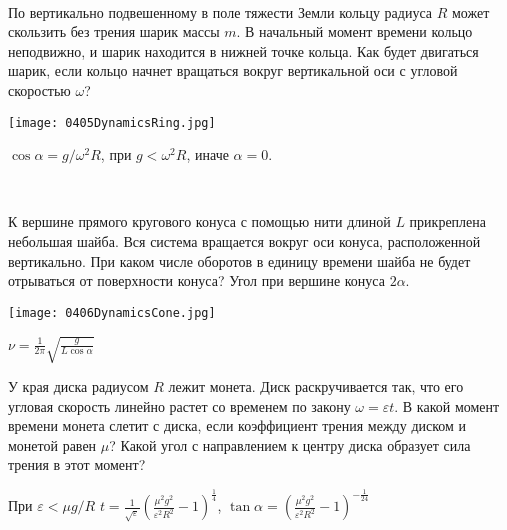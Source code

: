 \begin{ex}
\hspace{0pt} \\
\begin{minipage}{.65\textwidth}
По вертикально подвешенному в поле тяжести Земли кольцу радиуса $R$ может скользить без трения шарик массы $m$. 
В начальный момент времени кольцо неподвижно, и шарик находится в нижней точке кольца. 
Как будет двигаться шарик, если кольцо начнет вращаться вокруг вертикальной оси с угловой скоростью $\omega$?
\end{minipage}
\begin{minipage}{.35\textwidth}
\centering
\texttt{[image: 0405DynamicsRing.jpg]}
\end{minipage}
\begin{ans}
$\cos \alpha = g/\omega^2 R$, при $g < \omega^2 R$, иначе $\alpha = 0$.
\end{ans}
\end{ex}

\begin{ex}
\hspace{0pt} \\
\begin{minipage}{.65\textwidth}
К вершине прямого кругового конуса с помощью нити длиной $L$ прикреплена небольшая шайба. Вся система вращается вокруг оси конуса, расположенной вертикально. При каком числе оборотов в единицу времени шайба не будет отрываться от поверхности конуса? Угол при вершине конуса $2\alpha$.
\end{minipage}
\begin{minipage}{.35\textwidth}
\centering
\texttt{[image: 0406DynamicsCone.jpg]}
\end{minipage}
\begin{ans}
$\nu = \frac{1}{2\pi}\sqrt{\frac{g}{L \cos \alpha}}$
\end{ans}
\end{ex}

\begin{ex}
У края диска радиусом $R$ лежит монета. Диск раскручивается так, что его угловая скорость линейно растет со временем по закону $\omega = \varepsilon t$.  В какой момент времени монета слетит с диска, если коэффициент трения между диском и монетой равен $\mu$? Какой угол с направлением к центру диска образует сила трения в этот момент?
\begin{ans}
При $\varepsilon < \mu g /R$ $t=\frac{1}{\sqrt{\varepsilon}}\left( \frac{\mu^2 g^2}{\varepsilon^2 R^2} - 1 \right)^{\frac{1}{4}}$, $\tan \alpha = \left( \frac{\mu^2 g^2}{\varepsilon^2 R^2} - 1 \right)^{-\frac{1}{24}}$
\end{ans}
\end{ex}

